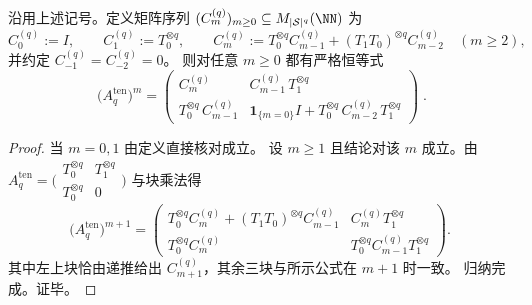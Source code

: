 \begin{proposition}\label{prop:pom-momq-tensor-kernel-noncommutative-fibonacci-powers}
沿用上述记号。定义矩阵序列 \((C_m^{(q)})_{m\ge 0}\subseteq M_{|\mathcal S|^q}(\NN)\) 为
\[
C_0^{(q)}:=I,\qquad
C_1^{(q)}:=T_0^{\otimes q},\qquad
C_m^{(q)}:=T_0^{\otimes q}C_{m-1}^{(q)}+(T_1T_0)^{\otimes q}C_{m-2}^{(q)}\quad(m\ge 2),
\]
并约定 \(C_{-1}^{(q)}=C_{-2}^{(q)}=0\)。
则对任意 \(m\ge 0\) 都有严格恒等式
\[
\boxed{\;
\bigl(A_q^{\mathrm{ten}}\bigr)^m
=
\begin{pmatrix}
C_m^{(q)} & C_{m-1}^{(q)}\,T_1^{\otimes q}\\[2pt]
T_0^{\otimes q}\,C_{m-1}^{(q)} & \mathbf 1_{\{m=0\}}I+T_0^{\otimes q}\,C_{m-2}^{(q)}\,T_1^{\otimes q}
\end{pmatrix}\; }.
\]
\end{proposition}
\begin{proof}
当 \(m=0,1\) 由定义直接核对成立。
设 \(m\ge 1\) 且结论对该 \(m\) 成立。由
\(
A_q^{\mathrm{ten}}=\bigl(\begin{smallmatrix}T_0^{\otimes q}&T_1^{\otimes q}\\ T_0^{\otimes q}&0\end{smallmatrix}\bigr)
\)
与块乘法得
\[
\bigl(A_q^{\mathrm{ten}}\bigr)^{m+1}
=
\begin{pmatrix}
T_0^{\otimes q}C_m^{(q)}+(T_1T_0)^{\otimes q}C_{m-1}^{(q)} & C_m^{(q)}T_1^{\otimes q}\\[2pt]
T_0^{\otimes q}C_m^{(q)} & T_0^{\otimes q}C_{m-1}^{(q)}T_1^{\otimes q}
\end{pmatrix}.
\]
其中左上块恰由递推给出 \(C_{m+1}^{(q)}\)，其余三块与所示公式在 \(m+1\) 时一致。
归纳完成。证毕。
\end{proof}
